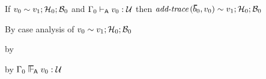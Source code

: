 \begin{lemma}\label{AT-addtrace}
  If\/ $v_0 \sim v_1; \mathcal{H}_0; \mathcal{B}_0$
  and\/ $\Gamma_0 \vdash_{\mathsf{A}} v_0 : {\mathcal U}$
  then\/ $\atrexpr{\faddtrace{\sblist_0}{\svalue_0}}{\svalue_1}{\vstore_0}{\bstore_0}$
\end{lemma}
\begin{lamportproof}
  By case analysis of $v_0 \sim v_1; \mathcal{H}_0; \mathcal{B}_0$

    \begin{pfproof}
      \qedstep
    \end{pfproof}

    \begin{pfproof}
        \begin{pfproof}
          \qedstep
        \end{pfproof}
        \begin{pfproof}
          \qedstep
        \end{pfproof}
        \begin{pfproof}
          \qedstep
        \end{pfproof}
        \begin{pfproof}
          \absurdstep
            \begin{pfproof}
              by 
            \end{pfproof}
        \end{pfproof}
        \begin{pfproof}
          \qedstep
        \end{pfproof}
        \begin{pfproof}
          \absurdstep
            \begin{pfproof}
              by $\stypeenv_0 \sWLA \svalue_0 : \tdyn$

\end{pfproof}
\end{pfproof}
\end{pfproof}
\end{lamportproof}
